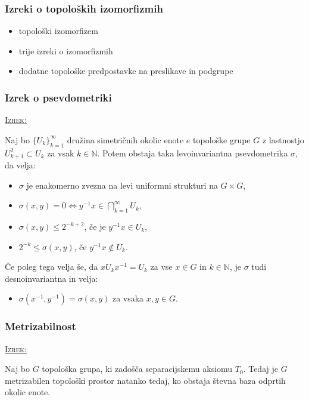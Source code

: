 \documentclass[a4paper, 12pt]{beamer}
\newenvironment{matematika}[1]{
\textcolor{bostonuniversityred}{\underline{\textsc{#1:}}}
}{
}
\begin{document}
\begin{frame}
\frametitle{Izreki o topoloških izomorfizmih}
\begin{itemize}[label = ]
	\item topološki izomorfizem
	\item trije izreki o izomorfizmih
	\item dodatne topološke predpostavke na preslikave in podgrupe
\end{itemize}
\end{frame}

\begin{frame}
\frametitle{Izrek o psevdometriki}
\begin{matematika}{Izrek}
	Naj bo $\{ U_k \}_{k=1}^{\infty}$ družina simetričnih okolic enote $e$ topo\-loš\-ke grupe $G$ z lastnostjo $U_{k+1}^2 \subset U_k$ za vsak $k\in\mathbb{N}$. Potem obstaja taka levoinvariantna psevdometrika $\sigma$, da velja:
	\begin{itemize}[label=]
		\item $\sigma$ je enakomerno zvezna na levi uniformni strukturi na $G \times G$,
		\item $\sigma (x, y) = 0 \iff y^{-1}x \in \bigcap_{k=1}^{\infty}U_k$,
		\item $\sigma (x, y) \leq 2^{-k+2}$, če je $y^{-1}x \in U_k$,
		\item $2^{-k} \leq \sigma (x, y)$, če $y^{-1}x \notin U_k$.
	\end{itemize}
	Če poleg tega velja še, da $x U_k x^{-1} = U_k$ za vse $x \in G$ in $k\in\mathbb{N}$, je $\sigma$ tudi desnoinvariantna in velja:
	\begin{itemize}[label=]
		\item $\sigma (x^{-1}, y^{-1}) = \sigma (x, y)$ za vsaka $x, y \in G$.
	\end{itemize}
\end{matematika}
\end{frame}

\begin{frame}
\frametitle{Metrizabilnost}
\begin{matematika}{Izrek}
Naj bo $G$ topološka grupa, ki zadošča separacijskemu aksiomu $T_0$. Tedaj je $G$ metrizabilen topološki prostor natanko tedaj, ko obstaja števna baza odprtih okolic enote.
\end{matematika}
\end{frame}
\end{document}
